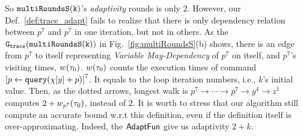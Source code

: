     So $\mathtt{multiRoundsS(k)}$'s \emph{adaptivity} rounds is only $2$. 
    However, our Def.~\ref{def:trace_adapt} fails to realize that there is only dependency relation 
    between $p^7$ and $p^7$ in one iteration, 
    but not in others. 
    As the $\mathtt{{G_{trace}}}(\mathtt{multiRoundsS(k)})$ in Fig.~\ref{fig:multiRoundsS}(b) shows, 
    there is an edge from $p^7$ to itself representing \emph{Variable May-Dependency} of $p^7$ on itself,
    and  $p^7$'s visiting times,
    $w_{}(\mathtt{\tau}_0)$. $w_{}(\mathtt{\tau}_0)$ counts the execution times of command $\clabel{\assign{p}{\query(\chi[y]+p)} }^{7}$. It equals to the loop iteration numbers, i.e., $k$'s initial value.
    Then, as the dotted arrows, 
    longest walk
    is $p^7  \to \cdots \to p^7 \to y^4  \to z^1 $
    computes $2 + w_{p^7}(\mathtt{\tau}_0)$, instead of $2$. It is worth to stress that our algorithm still compute an  accurate bound w.r.t this definition, even if the definition itself is over-approximating. Indeed, the $\textsf{AdaptFun}$  give us adaptivity $2 + k$.
